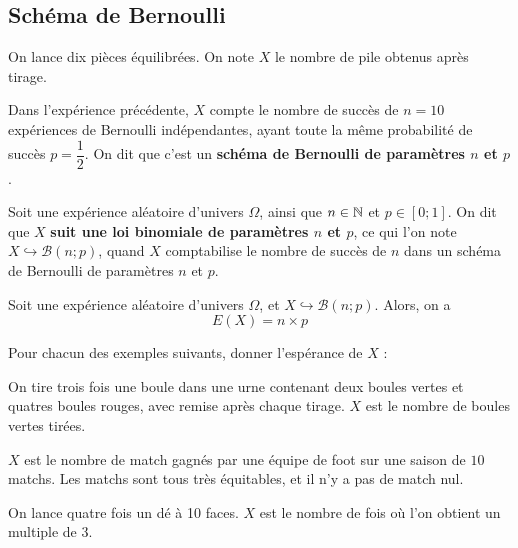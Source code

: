\documentclass{poly}
\begin{document}
\subsection{Schéma de Bernoulli}
\begin{example}
On lance dix pièces équilibrées. On note $X$ le nombre de pile obtenus après tirage.
\end{example}
\begin{remark}
Dans l'expérience précédente, $X$ compte le nombre de succès de $n = 10$ expériences de Bernoulli indépendantes, ayant toute la même probabilité de succès $p = \dfrac{1}{2}$. On dit que c'est un \textbf{schéma de Bernoulli de paramètres $n$ et $p$}.
\end{remark}    
\begin{definition}
Soit une expérience aléatoire d'univers $\Omega$, ainsi que $n \in \mathbb{N}$ et $p \in [0;1]$. On dit que $X$ \textbf{suit une loi binomiale de paramètres $n$ et $p$}, ce qui l'on note $X \hookrightarrow \mathcal{B}(n;p)$, quand $X$ comptabilise le nombre de succès de $n$ dans un schéma de Bernoulli de paramètres $n$ et $p$. 
\end{definition}
\begin{proposition}
Soit une expérience aléatoire d'univers $\Omega$, et $X \hookrightarrow \mathcal{B}(n;p)$. Alors, on a
\begin{equation*}
E(X) = n \times p
\end{equation*}
\end{proposition}
\begin{example}
Pour chacun des exemples suivants, donner l'espérance de $X$ :
\begin{alphaquestions}
\item On tire trois fois une boule dans une urne contenant deux boules vertes et quatres boules rouges, avec remise après chaque tirage. $X$ est le nombre de boules vertes tirées. 
\item $X$ est le nombre de match gagnés par une équipe de foot sur une saison de $10$ matchs. Les matchs sont tous très équitables, et il n'y a pas de match nul.
\item On lance quatre fois un dé à 10 faces. $X$ est le nombre de fois où l'on obtient un multiple de $3$.
\end{alphaquestions}
\end{example}
\newpage
\end{document}
